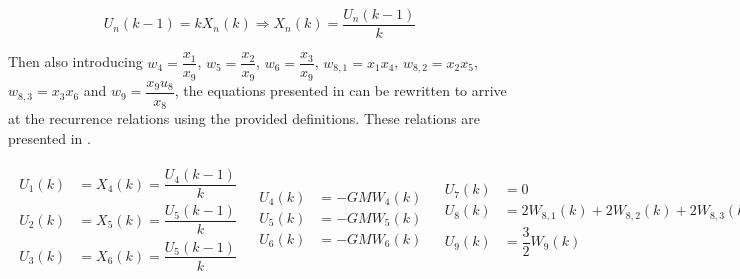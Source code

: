 \begin{equation} \label{eq:def_u}
U_{n}\left(k-1\right)=kX_{n}\left(k\right)\Rightarrow X_{n}\left(k\right)=\dfrac{U_{n}\left(k-1\right)}{k}
\end{equation}
 
Then also introducing $w_{4}=\dfrac{x_{1}}{x_{9}}$, $w_{5}=\dfrac{x_{2}}{x_{9}}$, $w_{6}=\dfrac{x_{3}}{x_{9}}$, $w_{8,1}=x_{1}x_{4}$, $w_{8,2}=x_{2}x_{5}$, $w_{8,3}=x_{3}x_{6}$ and $w_{9}=\dfrac{x_{9}u_{8}}{x_{8}}$, the equations presented in  can be rewritten to arrive at the recurrence relations using the provided definitions. These relations are presented in . 



\begin{align} \label{eq:full_rec_rel}
\begin{split} 
U_{1}\left(k\right)&=X_{4}\left(k\right)=\dfrac{U_{4}\left(k-1\right)}{k}\\
U_{2}\left(k\right)&=X_{5}\left(k\right)=\dfrac{U_{5}\left(k-1\right)}{k}\\
U_{3}\left(k\right)&=X_{6}\left(k\right)=\dfrac{U_{5}\left(k-1\right)}{k}
\end{split} 
&
\begin{split}
U_{4}\left(k\right)&=-GMW_{4}\left(k\right)\\
U_{5}\left(k\right)&=-GMW_{5}\left(k\right)\\
U_{6}\left(k\right)&=-GMW_{6}\left(k\right)
\end{split}
&
\begin{split}
U_{7}\left(k\right)&=0\\
U_{8}\left(k\right)&=2W_{8,1}\left(k\right)+2W_{8,2}\left(k\right)+2W_{8,3}\left(k\right)\\
U_{9}\left(k\right)&=\dfrac{3}{2}W_{9}\left(k\right)
\end{split}
\end{align}

